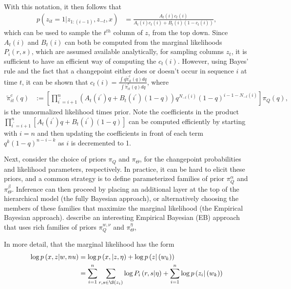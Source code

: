 \documentclass[14pt]{extarticle}
\begin{document}
With this notation, it then follows that
\begin{align*}
  p\left(z_{it} = 1 \vert z_{1:(i - 1)}, z_{-t}, x\right) &= \frac{A_{t}\left(i\right)c_{t}\left(i\right)}{A_{t}\left(i\right)c_t\left(i\right) + B_t\left(i\right)\left(1 - c_t\left(i\right)\right)},
\end{align*}
which can be used to sample the $t^{th}$ column of $z$, from the top down. Since
$A_{t}\left(i\right)$ and $B_{t}\left(i\right)$ can both be computed from the
marginal likelihoods $P_{i}\left(r, s\right)$, which are assumed available
analytically, for sampling columns $z_t$, it is sufficient to have an efficient
way of computing the $c_{t}\left(i\right)$. However, using Bayes' rule and the
fact that a changepoint either does or doesn't occur in sequence $i$ at time
$t$, it can be shown that $c_{t}\left(i\right) = \frac{\int q
  \tilde{\pi}_{it}^{c}\left(q\right) dq}{\int \tilde{\pi}_{it}^{c}\left(q\right)
  dq}$, where
\begin{align*}
  \tilde{\pi}_{it}^{c}\left(q\right) &:= \left[\prod_{i^\prime = i + 1}^{n} \left(A_{t}\left(i^\prime\right)q + B_{t}\left(i^\prime\right)\left(1 - q\right)\right)q^{N_{-t}\left(i\right)}\left(1 - q\right)^{i - 1 - N_{-t}\left(i\right)}\right] \pi_{Q}\left(q\right),
\end{align*}
is the unnormalized likelihood times prior. Note the coefficients in the product
$\prod_{i^\prime = i + 1}^{n} \left[A_{t}\left(i^\prime\right)q +
B_{t}\left(i^\prime\right)\left(1 - q\right)\right]$ can be computed efficiently by
starting with $i = n$ and then updating the coefficients in front of each term
$q^k \left(1 - q\right)^{n - i - k}$ as $i$ is decremented to 1.

Next, consider the choice of priors $\pi_{Q}$ and $\pi_{\Theta}$, for the
changepoint probabilities and likelihood parameters, respectively. In practice,
it can be hard to elicit these priors, and a common strategy is to define
parameterized families of prior $\pi_{Q}^{\alpha}$ and $\pi_{\Theta}^{\beta}$.
Inference can then proceed by placing an additional layer at the top of the
hierarchical model (the fully Bayesian approach), or alternatively choosing the
members of these families that maximize the marginal likelihood (the Empirical
Bayesian approach). \cite{fan2015empirical} describe an interesting Empirical
Bayesian (EB) approach that uses rich families of priors $\pi_{Q}^{w, \nu}$ and
$\pi_{\Theta}^{\eta}$,

In more detail, that the marginal likelihood has the form
\begin{align}
 \label{eq:pi_q_marginal_lik}
 \log p\left(x, z \vert w, nu\right) &= \log p\left(x, \vert z, \eta\right) + \log p\left(z \vert \left(w_k\right)\right) \\
 &= \sum_{i = 1}^{n} \sum_{r, s \in \S\left(z_{i}\right)} \log P_{i}\left(r, s \vert \eta \right) + \sum_{i = 1}^{n} \log p\left(z_{i} \vert \left(w_{k}\right)\right)
\end{align}
\end{document}
